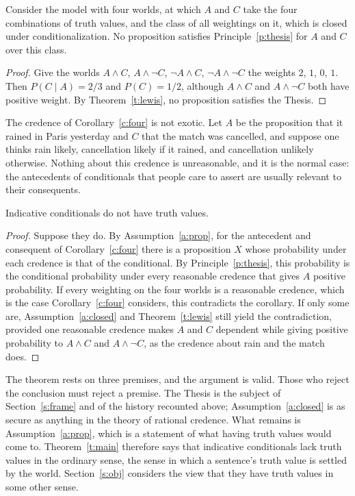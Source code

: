 \documentclass{situationist-preprint}
\begin{document}
\begin{corollary}\label{c:four}
Consider the model with four worlds, at which $A$ and $C$ take the four combinations of truth values, and the class of all weightings on it, which is closed under conditionalization. No proposition satisfies Principle~\ref{p:thesis} for $A$ and $C$ over this class.
\end{corollary}

\begin{proof}
Give the worlds $A \wedge C$, $A \wedge \neg C$, $\neg A \wedge C$, $\neg A \wedge \neg C$ the weights $2$, $1$, $0$, $1$. Then $P(C \mid A) = 2/3$ and $P(C) = 1/2$, although $A \wedge C$ and $A \wedge \neg C$ both have positive weight. By Theorem~\ref{t:lewis}, no proposition satisfies the Thesis.
\end{proof}

The credence of Corollary~\ref{c:four} is not exotic. Let $A$ be the proposition that it rained in Paris yesterday and $C$ that the match was cancelled, and suppose one thinks rain likely, cancellation likely if it rained, and cancellation unlikely otherwise. Nothing about this credence is unreasonable, and it is the normal case: the antecedents of conditionals that people care to assert are usually relevant to their consequents.

\begin{theorem}\label{t:main}
Indicative conditionals do not have truth values.
\end{theorem}

\begin{proof}
Suppose they do. By Assumption~\ref{a:prop}, for the antecedent and consequent of Corollary~\ref{c:four} there is a proposition $X$ whose probability under each credence is that of the conditional. By Principle~\ref{p:thesis}, this probability is the conditional probability under every reasonable credence that gives $A$ positive probability. If every weighting on the four worlds is a reasonable credence, which is the case Corollary~\ref{c:four} considers, this contradicts the corollary. If only some are, Assumption~\ref{a:closed} and Theorem~\ref{t:lewis} still yield the contradiction, provided one reasonable credence makes $A$ and $C$ dependent while giving positive probability to $A \wedge C$ and $A \wedge \neg C$, as the credence about rain and the match does.
\end{proof}

The theorem rests on three premises, and the argument is valid. Those who reject the conclusion must reject a premise. The Thesis is the subject of Section~\ref{s:frame} and of the history recounted above; Assumption~\ref{a:closed} is as secure as anything in the theory of rational credence. What remains is Assumption~\ref{a:prop}, which is a statement of what having truth values would come to. Theorem~\ref{t:main} therefore says that indicative conditionals lack truth values in the ordinary sense, the sense in which a sentence's truth value is settled by the world. Section~\ref{s:obj} considers the view that they have truth values in some other sense.
\end{document}
